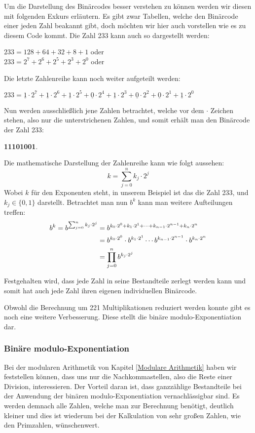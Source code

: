 \documentclass[12pt,a4paper]{article}
\theoremstyle{definition}
\begin{document}
Um die Darstellung des Binärcodes besser verstehen zu können werden wir diesen mit folgenden Exkurs erläutern.
\label{Binärcode der Zahl 233} Es gibt zwar Tabellen, welche den Binärcode einer jeden Zahl beakannt gibt, doch möchten wir hier auch vorstellen wie es zu diesem Code kommt.
Die Zahl 233 kann auch so dargestellt werden:
\begin{center}
$233 = 128 + 64 + 32 + 8 + 1$ oder \\
$233 = 2^7 + 2^6 + 2^5 + 2^3 + 2^0$ oder \\
\end{center}
Die letzte Zahlenreihe kann noch weiter aufgeteilt werden:
\begin{center}
$233 = \underline{1} \cdot 2^7 + \underline{1} \cdot 2^6 + \underline{1} \cdot 2^5 + \underline{0} \cdot2^4 + \underline{1} \cdot 2^3 + \underline{0} \cdot2^2 + \underline{0} \cdot 2^1 + \underline{1} \cdot 2^0$
\end{center}
Nun werden ausschließlich jene Zahlen betrachtet, welche vor dem $\cdot$ Zeichen stehen, also nur die unterstrichenen Zahlen, und somit erhält man den Binärcode der Zahl 233:
\begin{center}
\textbf{11101001}.
\end{center}
Die mathematische Darstellung der Zahlenreihe kann wie folgt aussehen:
\[k = \sum_{j=0}^n k_j \cdot 2^j\]
Wobei $k$ für den Exponenten steht, in unserem Beispiel ist das die Zahl 233, und $k_j \in \{0, 1\}$ darstellt.
Betrachtet man nun $b^k$ kann man weitere Aufteilungen treffen:
\begin{align}\setcounter{equation}{0}
b^k = b^{\sum_{j=0}^n k_j \cdot 2^j} &= b^{k_0 \cdot 2^0 + k_1 \cdot 2^1 + \cdots + k_{n-1} \cdot 2^{n-1} + k_n \cdot 2^n} \\
                                    &= b^{k_0 \cdot 2^0} \cdot b^{k_1 \cdot 2^1} \cdots b^{k_{n-1} \cdot 2^{n-1}} \cdot b^{{k_n} \cdot 2^n} \\
                                    &= \prod_{j=0}^n b^{k_j \cdot 2^j}
\end{align}

Festgehalten wird, dass jede Zahl in seine Bestandteile zerlegt werden kann und somit hat auch jede Zahl ihren eigenen individuellen Binärcode.

Obwohl die Berechnung um 221 Multiplikationen reduziert werden konnte gibt es noch eine weitere Verbesserung.
Diese stellt die binäre modulo-Exponentiation dar.

\subsubsection{Binäre modulo-Exponentiation}
Bei der modularen Arithmetik von Kapitel \ref{Modulare Arithmetik} haben wir feststellen können, dass uns nur die Nachkommastellen, also die Reste einer Division, interessieren.
Der Vorteil daran ist, dass ganzzählige Bestandteile bei der Anwendung der binären modulo-Exponentiation vernachlässigbar sind.
Es werden demnach alle Zahlen, welche man zur Berechnung benötigt, deutlich kleiner und dies ist wiederum bei der Kalkulation von sehr großen Zahlen, wie den Primzahlen, wünschenwert.
\end{document}

